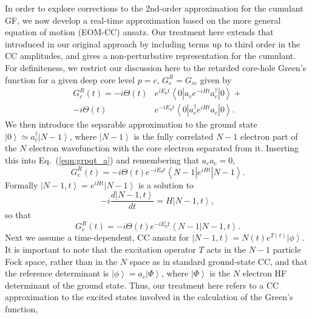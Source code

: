 \documentclass[aps,prb,twocolumn,groupaddress,floatfix]{revtex4}
\begin{document}
In order to explore corrections to the 2nd-order approximation
for the cumulant GF, we  now develop a real-time approximation
based on the more general equation of motion (EOM-CC) ansatz.
Our treatment here extends that introduced in our original
approach\cite{RVKNKP} by including terms up to third order in the
CC amplitudes, and gives a non-perturbative representation for the cumulant.
For definiteness, we restrict our discussion here to the retarded
core-hole Green's function for a given deep core level $p=c$, $G^R_c=G_{cc}$
given by
\begin{equation}
\label{eqn:grpqt_a}
\begin{split}
G_{c}^{R}(t) =
-i \Theta(t) &
  e^{iE_0t} \left<0\left| a_c e^{-iHt} a_c^\dagger \right| 0 \right> + \\
-i \Theta(t) &
e^{-iE_0t}\left<0\left| a_c^\dagger e^{iHt} a_c \right| 0 \right>.
\end{split}
\end{equation}
We then introduce the separable approximation to the ground state $\left| 0
\right> \simeq a_c^\dagger \left| N-1 \right>$, where $\left| N-1 \right>$ is
the fully correlated $N-1$ electron part of the $N$ electron wavefunction with
the core electron separated from it. Inserting this into Eq.\
(\ref{eqn:grpqt_a}) and remembering that $a_c a_c = 0$,
\begin{equation}
\label{eqn:grpqt_b}
G_{c}^{R}(t) =
-i \Theta(t) e^{-iE_0t}\left<N-1\left| e^{iHt} \right| N-1 \right>.
\end{equation}
Formally $\left| N-1, t \right> = e^{iHt}\left| N-1 \right>$ is a
solution to
\begin{equation}
-i \frac{d\left| N-1, t \right>}{dt} = H \left| N-1, t \right>,
\end{equation}
so that 
\begin{equation}
\label{eqn:grpqt_c}
G_{c}^{R}(t) =
-i \Theta(t) e^{-iE_0t}\left<N-1\right| \left. N-1, t \right>.
\end{equation}
Next we assume a time-dependent, CC ansatz for
$\left| N-1, t \right> = N(t) e^{T(t)} \left| \phi \right>$. It is important to
note that the excitation operator $T$ acts in the $N-1$ particle Fock space, rather than in the $N$ space as in standard ground-state CC, and that the reference determinant is
$\left| \phi \right> = a_c \left| \Phi \right>$,
where $\left| \Phi \right>$ is the $N$ electron HF
determinant of the ground state.
Thus, our treatment here refers to a CC approximation to
the excited states involved in the calculation of the Green's function,
\end{document}
